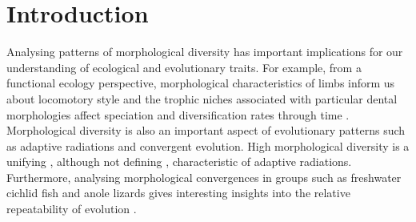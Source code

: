 \chapter{Introduction}
\label{chap:introduction}






\noindent


	Analysing patterns of morphological diversity has important implications for our understanding of ecological and evolutionary traits. For example, from a functional ecology perspective, morphological characteristics of limbs inform us about locomotory style \citep[e.g.][]{Bou1987} and the trophic niches associated with particular dental morphologies affect speciation and diversification rates through time \citep{Price2012}. Morphological diversity is also an important aspect of evolutionary patterns such as adaptive radiations and convergent evolution. High morphological diversity is a unifying \citep{Losos2010a, Olson2009}, although not defining \citep{Glor2010, Olson2009}, characteristic of adaptive radiations. Furthermore, analysing morphological convergences in groups such as freshwater cichlid fish \citep{Muschick2012} and anole lizards \citep{Mahler2013} gives interesting insights into the relative repeatability of evolution \citep{Losos2011}.

